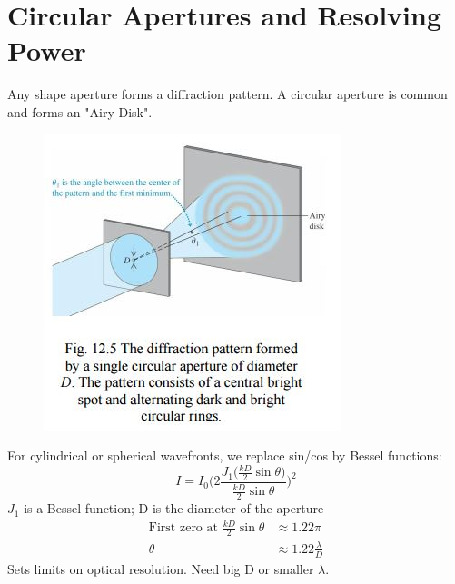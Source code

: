\documentclass[a4paper, 11pt, normalem]{report}
\begin{document}
\section{Circular Apertures and Resolving Power}
Any shape aperture forms a diffraction pattern.
A circular aperture is common and forms an "Airy Disk".
\begin{figure}[H]
    \centering
    \includegraphics{Airy.jpg} 
\end{figure}
For cylindrical or spherical wavefronts, we replace sin/cos by Bessel functions:
\begin{equation}
    I = I_{0}\Bigg(2\frac{J_{1}\big(\tfrac{kD}{2}\sin{\theta}\big)}{\tfrac{kD}{2}\sin{\theta}}\Bigg)^{2}
\end{equation}
$J_{1}$ is a Bessel function; D is the diameter of the aperture
\begin{align}
    \text{First zero at }\frac{kD}{2}\sin{\theta} &\approx 1.22\pi \\
    \theta &\approx 1.22\frac{\lambda}{D}
\end{align}
Sets limits on optical resolution.
Need big D or smaller $\lambda$.
\end{document}
